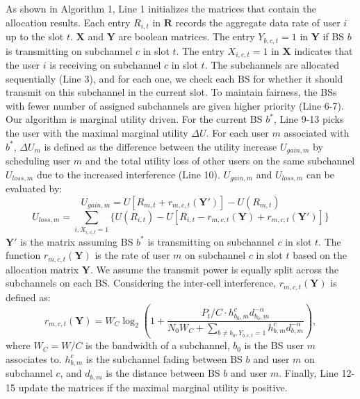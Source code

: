 \documentclass[conference]{IEEEtran}
\begin{document}
As shown in Algorithm 1, Line 1 initializes the matrices that contain the allocation results. Each entry $R_{i, t}$ in $\mathbf{R}$ records the aggregate data rate of user $i$ up to the slot $t$. $\mathbf{X}$ and $\mathbf{Y}$ are boolean matrices. The entry $Y_{b, c, t} = 1$ in $\mathbf{Y}$ if BS $b$ is transmitting on subchannel $c$ in slot $t$. The entry $X_{i, c, t} = 1$ in $\mathbf{X}$ indicates that the user $i$ is receiving on subchannel $c$ in slot $t$. The subchannels are allocated sequentially (Line 3), and for each one, we check each BS for whether it should transmit on this subchannel in the current slot. To maintain fairness, the BSs with fewer number of assigned subchannels are given higher priority (Line 6-7). Our algorithm is marginal utility driven. For the current BS $b^{*}$, Line 9-13 picks the user with the maximal marginal utility $\Delta U$. For each user $m$ associated with $b^*$, $\Delta U_m$ is defined as the difference between the utility increase $U_{gain, m}$ by scheduling user $m$ and the total utility loss of other users on the same subchannel $U_{loss, m}$ due to the increased interference (Line 10). $U_{gain, m}$ and $U_{loss, m}$ can be evaluated by:
\begin{equation}
U_{gain, m} = U[R_{m, t} + r_{m, c, t}(\mathbf{Y'})] - U(R_{m, t})
\end{equation}
\begin{equation}
U_{loss, m} =  \sum_{i, X_{i, c, t} = 1} \{U(R_{i, t}) - U[R_{i, t} - r_{m, c, t}(\mathbf{Y}) + r_{m, c, t}(\mathbf{Y'})]\}
\end{equation}
$\mathbf{Y'}$ is the matrix assuming BS $b^*$ is transmitting on subchannel $c$ in slot $t$. The function $r_{m, c, t}(\mathbf{Y})$ is the rate of user $m$ on subchannel $c$ in slot $t$ based on the allocation matrix $\mathbf{Y}$. We assume the transmit power is equally split across the subchannels on each BS. Considering the inter-cell interference, $r_{m, c, t}(\mathbf{Y})$ is defined as:
\begin{equation}
r_{m, c, t}(\mathbf{Y}) = W_C \log_2(1 + \frac{P_{t} / C \cdot h_{b_0, m}^c d_{b_0, m}^{-\alpha}}{N_0 W_C + \sum_{b \ne b_0, Y_{b, c, t} = 1}h_{b, m}^{c} d_{b, m}^{-\alpha}}),
\end{equation}
where $W_C = W/C$ is the bandwidth of a subchannel, $b_0$ is the BS user $m$ associates to. $h_{b, m}^{c}$ is the subchannel fading between BS $b$ and user $m$ on subchannel $c$, and $d_{b, m}$ is the distance between BS $b$ and user $m$. Finally, Line 12-15 update the matrices if the maximal marginal utility is positive.
\end{document}
